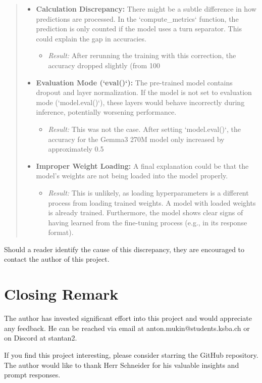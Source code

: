 \documentclass{article}
\begin{document}
\begin{quote}
{\begin{itemize}
    \item \textbf{Calculation Discrepancy:} There might be a subtle difference in how predictions are processed. In the `compute\_metrics` function, the prediction is only counted if the model uses a turn separator. This could explain the gap in accuracies.
        \begin{itemize}
            \item \textit{Result:} After rerunning the training with this correction, the accuracy dropped slightly (from 100%
        \end{itemize}

    \item \textbf{Evaluation Mode (`eval()`):} The pre-trained model contains dropout and layer normalization. If the model is not set to evaluation mode (`model.eval()`), these layers would behave incorrectly during inference, potentially worsening performance.
        \begin{itemize}
            \item \textit{Result:} This was not the case. After setting `model.eval()`, the accuracy for the Gemma3 270M model only increased by approximately 0.5%
        \end{itemize}

    \item \textbf{Improper Weight Loading:} A final explanation could be that the model's weights are not being loaded into the model properly.
        \begin{itemize}
            \item \textit{Result:} This is unlikely, as loading hyperparameters is a different process from loading trained weights. A model with loaded weights is already trained. Furthermore, the model shows clear signs of having learned from the fine-tuning process (e.g., in its response format).
        \end{itemize}
\end{itemize}
}
\end{quote}
Should a reader identify the cause of this discrepancy, they are encouraged to contact the author of this project.
\newpage
\section{Closing Remark}

The author has invested significant effort into this project and would appreciate any feedback. He can be reached via email at anton.mukin@students.ksba.ch or on Discord at stantan2.

If you find this project interesting, please consider starring the GitHub repository.
\\[2em]
The author would like to thank Herr Schneider for his valuable insights and prompt responses.


\newpage
\printbibliography[heading=bibintoc]
\end{document}
